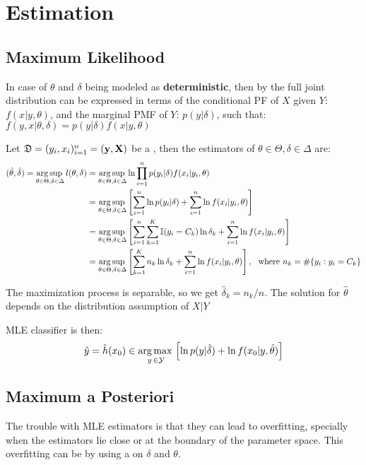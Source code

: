 \section{Estimation}

\subsection{Maximum Likelihood}
In case of $\theta$ and $\delta$ being modeled as \textbf{deterministic}, then by  the full joint distribution can be expressed in terms of the conditional PF of $X$ given $Y$: $f(x|y,\theta)$, and the marginal PMF of $Y$: $p(y|\delta)$, such that: 
$f(y,x|\theta,\delta) = p(y|\delta)f(x|y,\theta)$

Let $\mathfrak{D}=(y_i,x_i)_{i=1}^n=(\vb{y},\vb{X})$ be a , then the  estimators of $\theta\in\Theta, \delta\in\Delta$ are:
\begin{align*}
    (\hat{\theta},\hat{\delta}) = \operatorname*{arg\,sup\,}_{\theta\in\Theta, \delta\in\Delta}l(\theta,\delta) &= \operatorname*{arg\,sup\,}_{\theta\in\Theta, \delta\in\Delta} \ln\prod_{i=1}^n p(y_i|\delta)f(x_i|y_i,\theta) \\
    &= \operatorname*{arg\,sup\,}_{\theta\in\Theta, \delta\in\Delta} \left[\sum_{i=1}^n\ln p(y_i|\delta)+\sum_{i=1}^n\ln f(x_i|y_i,\theta)\right] \\
    &= \operatorname*{arg\,sup\,}_{\theta\in\Theta, \delta\in\Delta} \left[\sum_{i=1}^n\sum_{k=1}^K \operatorname{\mathbb{I}}(y_i=C_k)\ln\delta_k+\sum_{i=1}^n\ln f(x_{i}|y_i,\theta)\right]\\
    &= \operatorname*{arg\,sup\,}_{\theta\in\Theta, \delta\in\Delta} \left[\sum_{k=1}^K n_k\ln\delta_k+\sum_{i=1}^n\ln f(x_{i}|y_i,\theta)\right],\ \text{ where } n_k=\#\{y_i : y_i=C_k\}
\end{align*}

The maximization process is separable, so we get $\hat{\delta}_{k}=n_k/n$. The solution for $\hat{\theta}$ depends on the distribution assumption of $X|Y$

MLE classifier is then:
\begin{equation*}
    \hat{y}=\hat{h}(x_0) \in \operatorname*{arg\,max\,}_{y\,\in\mathcal{Y}}\left[ \ln p(y|\hat{\delta})+\ln f(x_0|y,\hat{\theta})\right]
\end{equation*}

\subsection{Maximum a Posteriori}
The trouble with MLE estimators is that they can lead to overfitting, specially when the estimators lie close or at the boundary of the parameter space. This overfitting can be  by using a  on $\delta$ and $\theta$. 

